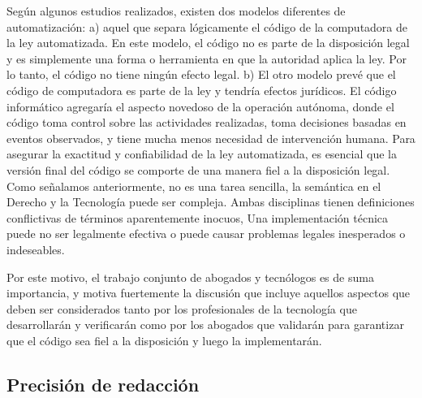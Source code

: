\documentclass[12pt]{report} %
\begin{document}
Según algunos estudios realizados, existen dos modelos diferentes de automatización: a) aquel que separa lógicamente el código de la computadora de la ley automatizada. En este modelo, el código no es parte de la disposición legal y es simplemente una forma o herramienta en que la autoridad aplica la ley. Por lo tanto, el código no tiene ningún efecto legal. b) El otro modelo prevé que el código de computadora es parte de la ley y tendría efectos jurídicos. El código informático agregaría el aspecto novedoso de la operación autónoma, donde el código toma control sobre las actividades realizadas, toma decisiones basadas en eventos observados, y tiene mucha menos necesidad de intervención humana. Para asegurar la exactitud y confiabilidad de la ley automatizada, es esencial que la versión final del código se comporte de una manera fiel a la disposición legal. Como señalamos anteriormente, no es una tarea sencilla, la semántica en el Derecho y la Tecnología puede ser compleja. Ambas disciplinas tienen definiciones conflictivas de términos aparentemente inocuos, Una implementación técnica puede no ser legalmente efectiva o puede causar problemas legales inesperados o indeseables.

Por este motivo, el trabajo conjunto de abogados y tecnólogos es de suma importancia, y motiva fuertemente la discusión que incluye aquellos aspectos que deben ser considerados tanto por los profesionales de la tecnología que desarrollarán y verificarán como por los abogados que validarán para garantizar que el código sea fiel a la disposición y luego la implementarán. 

\subsection{Precisión de redacción}
\end{document}
